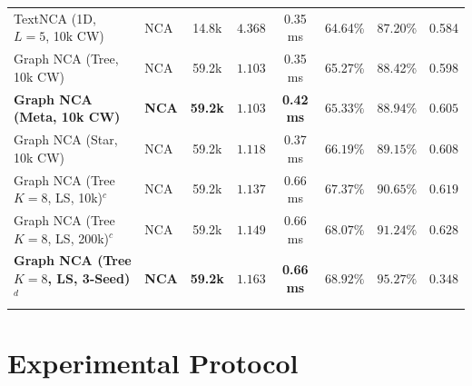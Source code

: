 \documentclass[10pt,twocolumn,letterpaper]{article}
\begin{document}
\begin{table}[tbp]
\begin{tabular*}{\textwidth}{@{\extracolsep{\fill}}llcccccc@{}}
\midrule
TextNCA (1D, $L{=}5$, 10k CW) & NCA & 14.8k & $4.368$ & 0.35 ms & 64.64\% & 87.20\% & 0.584 \\
Graph NCA (Tree, 10k CW) & NCA & 59.2k & $1.103$ & 0.35 ms & 65.27\% & 88.42\% & 0.598 \\
\textbf{Graph NCA (Meta, 10k CW)} & \textbf{NCA} & \textbf{59.2k} & $\mathbf{1.103}$ & \textbf{0.42 ms} & $\mathbf{65.33\%}$ & $\mathbf{88.94\%}$ & $\mathbf{0.605}$ \\
Graph NCA (Star, 10k CW) & NCA & 59.2k & $1.118$ & 0.37 ms & $\mathbf{66.19\%}$ & $\mathbf{89.15\%}$ & $\mathbf{0.608}$ \\
\midrule
Graph NCA (Tree $K{=}8$, LS, 10k)$^c$ & NCA & 59.2k & $1.137$ & 0.66 ms & $67.37\%$ & $90.65\%$ & $0.619$ \\
Graph NCA (Tree $K{=}8$, LS, 200k)$^c$ & NCA & 59.2k & $1.149$ & 0.66 ms & $68.07\%$ & $91.24\%$ & $\mathbf{0.628}$ \\
\textbf{Graph NCA (Tree $K{=}8$, LS, 3-Seed)}$^d$ & \textbf{NCA} & \textbf{59.2k} & $\mathbf{1.163}$ & \textbf{0.66 ms} & $\mathbf{68.92\%}$ & $\mathbf{95.27\%}$ & $0.348$ \\
\bottomrule
\end{tabular*}
\end{table}

\section{Experimental Protocol}
\end{document}
